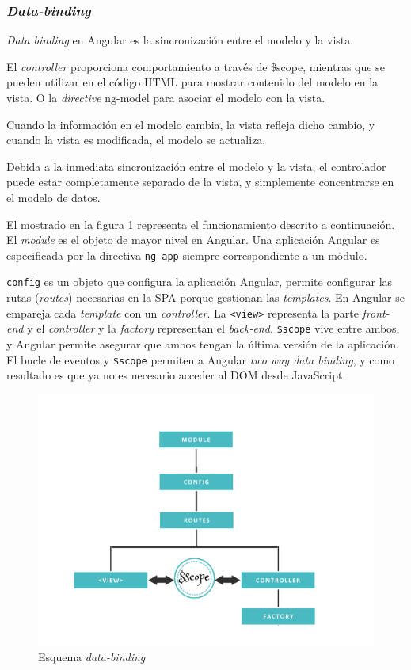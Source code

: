 \subsubsection{\textit{Data-binding}}
\textit{Data binding} en Angular es la sincronización entre el modelo y la vista.


El \textit{controller} proporciona comportamiento a través de \$scope, mientras que {{}} se pueden utilizar en el código HTML para mostrar contenido del modelo en la vista. O la \textit{directive} ng-model para asociar el modelo con la vista.


Cuando la información en el modelo cambia, la vista refleja dicho cambio, y cuando la vista es modificada, el modelo se actualiza.


Debida a la inmediata sincronización entre el modelo y la vista, el controlador puede estar completamente separado de la vista, y simplemente concentrarse en el modelo de datos\cite{data_binding_w3s}.


El mostrado en la figura \ref{fig:data_binding} representa el funcionamiento descrito a continuación. El \textit{module} es el objeto de mayor nivel en Angular. Una aplicación Angular es especificada por la directiva \texttt{ng-app} siempre correspondiente a un módulo.


\texttt{config} es un objeto que configura la aplicación Angular, permite configurar las rutas (\textit{routes}) necesarias en la SPA porque gestionan las \textit{templates}. En Angular se empareja cada \textit{template} con un \textit{controller}. La \texttt{<view>} representa la parte \textit{front-end} y el \textit{controller} y la \textit{factory}  representan el \textit{back-end}. \texttt{\$scope} vive entre ambos, y Angular permite asegurar que ambos tengan la última versión de la aplicación. El bucle de eventos y \texttt{\$scope} permiten a Angular \textit{two way data binding}, y como resultado es que ya no es necesario acceder al DOM desde JavaScript\cite{paislee}.   


\begin{figure}[htbp] 
    \centering
    \includegraphics[width=1\textwidth]{figuras/data_binding.png}
    \caption{Esquema \textit{data-binding}}
    \label{fig:data_binding}
\end{figure}	


